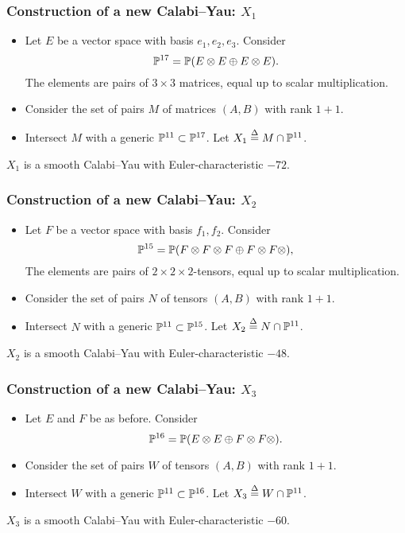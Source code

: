 \begin{frame}
\frametitle{Construction of a new Calabi--Yau: $X_1$}

\begin{itemize}
	\item Let $E$ be a vector space with basis $e_1,e_2,e_3$. Consider
	$$
	\P^{17} = \P(E \otimes E \oplus E \otimes E).
	$$
	The elements are pairs of $3 \times 3$ matrices, equal up to scalar multiplication.
	\item Consider the set of pairs $M$ of matrices $(A,B)$ with rank $1+1$. 
	\item Intersect $M$ with a generic $\P^{11} \subset \P^{17}$. Let $X_1 \stackrel \Delta = M \cap \P^{11}$.
\end{itemize}

\begin{theorem}
$X_1$ is a smooth Calabi--Yau with Euler-characteristic $-72$.
\end{theorem}

\end{frame}


\begin{frame}
\frametitle{Construction of a new Calabi--Yau: $X_2$}

\begin{itemize}
	\item Let $F$ be a vector space with basis $f_1,f_2$. Consider
	$$
\P^{15} = \P(F \otimes F \otimes F \oplus F \otimes F \otimes),
	$$
	The elements are pairs of $2 \times 2 \times 2$-tensors, equal up to scalar multiplication.
	\item Consider the set of pairs $N$ of tensors $(A,B)$ with rank $1+1$.
	\item Intersect $N$ with a generic $\P^{11} \subset \P^{15}$. Let $X_2 \stackrel \Delta = N \cap \P^{11}$.
\end{itemize}

\begin{theorem}
$X_2$ is a smooth Calabi--Yau with Euler-characteristic $-48$.
\end{theorem}

\end{frame}

\begin{frame}
\frametitle{Construction of a new Calabi--Yau: $X_3$}

\begin{itemize}
	\item Let $E$ and $F$ be as before. Consider
	$$
\P^{16} = \P(E \otimes E \oplus F \otimes F \otimes).
	$$
	\item Consider the set of pairs $W$ of tensors $(A,B)$ with rank $1+1$.
	\item Intersect $W$ with a generic $\P^{11} \subset \P^{16}$. Let $X_3 \stackrel \Delta =  W \cap \P^{11}$.
\end{itemize}

\begin{theorem}
$X_3$ is a smooth Calabi--Yau with Euler-characteristic $-60$.
\end{theorem}

\end{frame}

